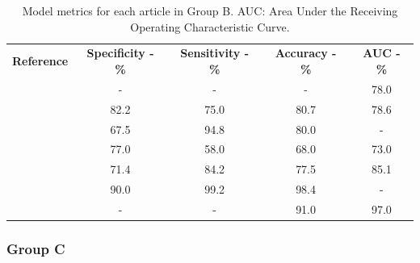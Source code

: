\documentclass[11pt]{article}
\begin{document}
\begin{table}[]
    \centering
    \begin{tabular}{ccccc}\toprule
        \multirow{2}{*}{\textbf{Reference}} & \multirow{2}{*}{\textbf{Specificity - \%}} & \multirow{2}{*}{\textbf{Sensitivity - \%}} & \multirow{2}{*}{\textbf{Accuracy - \%}} & \multirow{2}{*}{\textbf{AUC - \%}} \\
        \\\midrule
        \cite{Shoemaker2018}                & -                                          & -                                          & -                                       & 78.0                               \\
        \cite{Koyuncu2019}                  & 82.2                                       & 75.0                                       & 80.7                                    & 78.6                               \\
        \cite{Li2019}                       & 67.5                                       & 94.8                                       & 80.0                                    & -                                  \\
        \cite{Andersen2021}                 & 77.0                                       & 58.0                                       & 68.0                                    & 73.0                               \\
        \cite{Moawad2021}                   & 71.4                                       & 84.2                                       & 77.5                                    & 85.1                               \\
        \cite{Barstugan2020}                & 90.0                                       & 99.2                                       & 98.4                                    & -                                  \\
        \cite{Stanzione2021}                & -                                          & -                                          & 91.0                                    & 97.0                               \\
        \bottomrule
    \end{tabular}
    \caption{Model metrics for each article in Group B. AUC: Area Under the Receiving Operating Characteristic Curve.}
    \label{tab:res_B}
\end{table}

\subsubsection{Group C}
\end{document}
